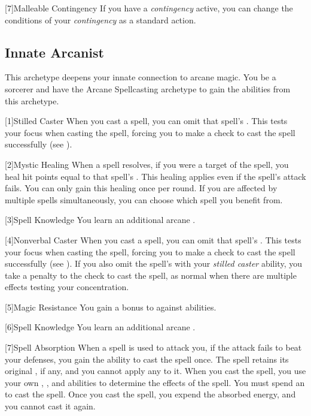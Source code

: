         [7]{Malleable Contingency} If you have a \textit{contingency} active, you can change the conditions of your \textit{contingency} as a standard action.

    \subsection{Innate Arcanist}
        This archetype deepens your innate connection to arcane magic.
        You be a sorcerer and have the Arcane Spellcasting archetype to gain the abilities from this archetype.

        [1]{Stilled Caster} When you cast a spell, you can omit that spell's .
        This tests your focus when casting the spell, forcing you to make a  check to cast the spell successfully (see ).

        [2]{Mystic Healing}
        When a spell resolves, if you were a target of the spell, you heal hit points equal to that spell's .
        This healing applies even if the spell's attack fails.
        You can only gain this healing once per round.
        If you are affected by multiple spells simultaneously, you can choose which spell you benefit from.

        [3]{Spell Knowledge} You learn an additional arcane .

        [4]{Nonverbal Caster} When you cast a spell, you can omit that spell's .
        This tests your focus when casting the spell, forcing you to make a  check to cast the spell successfully (see ).
        If you also omit the spell's  with your \textit{stilled caster} ability,
            you take a  penalty to the  check to cast the spell,
            as normal when there are multiple effects testing your concentration.

        [5]{Magic Resistance} You gain a  bonus to  against  abilities.

        [6]{Spell Knowledge} You learn an additional arcane .

        [7]{Spell Absorption} When a spell is used to attack you, if the attack fails to beat your defenses, you gain the ability to cast the spell once.
        The spell retains its original , if any, and you cannot apply any  to it.
        When you cast the spell, you use your own , , and abilities to determine the effects of the spell.
        You must spend an  to cast the spell.
        Once you cast the spell, you expend the absorbed energy, and you cannot cast it again.

